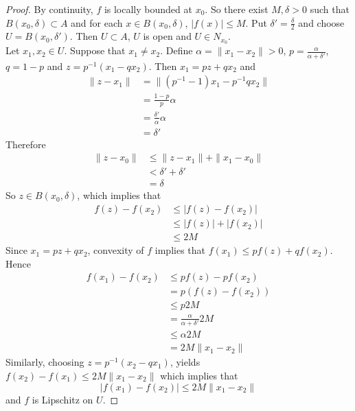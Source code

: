 \documentclass[12pt]{amsart}
\theoremstyle{definition}
\newcommand{\al}{\alpha}
\newcommand{\del}{\delta}
\begin{document}
	\begin{proof}
	By continuity, $f$ is locally bounded at $x_0$. So there exist $M, \del >0$ such that $B(x_0, \del) \subset A$ and for each $x \in B(x_0, \del)$, $|f(x)| \leq M$. Put $\del' = \frac{\del}{2}$ and choose $U = B(x_0, \del')$. Then $U \subset A$, $U$ is open and $U \in N_{x_0}$. \\
	Let $x_1, x_2 \in U$. Suppose that $x_1 \neq x_2$. Define $\al = \|x_1 - x_2\| >0$, $p = \frac{\al}{\al + \del'}$, $q = 1-p$ and $z = p^{-1}(x_1 - qx_2)$. Then $x_1 = pz + qx_2$ and 
	\begin{align*}
	\|z - x_1\| 
	&= \|(p^{-1} - 1)x_1 - p^{-1}qx_2\| \\
	&= \frac{1-p}{p} \al \\
	&= \frac{\del'}{\al} \al \\
	&= \del ' 
	\end{align*}
	Therefore 
	\begin{align*}
	\|z - x_0\| 
	& \leq \|z - x_1\| + \|x_1 - x_0\| \\
	& <  \del '  + \del '  \\
	&= \del
\end{align*}	  
	So $z \in B(x_0, \del)$, which implies that 
	\begin{align*}
	f(z) - f(x_2) 
	& \leq |f(z) - f(x_2)|\\ 
	&\leq |f(z)| + |f(x_2)| \\
	&\leq 2M
\end{align*}		
	Since $x_1 = pz + qx_2$, convexity of $f$ implies that $f(x_1) \leq pf(z) + qf(x_2)$. Hence 
	\begin{align*}
	f(x_1) - f(x_2) 
	& \leq pf(z) -pf(x_2) \\
	&= p(f(z) - f(x_2)) \\
	& \leq p 2M \\
	&= \frac{\al}{\al + \del'} 2M \\
	& \leq \al 2M \\
	&= 2M \|x_1 - x_2 \|
	\end{align*}
	Similarly, choosing $z = p^{-1}(x_2 - qx_1)$, yields $f(x_2) - f(x_1) \leq 2M \|x_1 - x_2 \|$ which implies that $$|f(x_1) - f(x_2)| \leq 2M \|x_1 - x_2 \|$$ and $f$ is Lipschitz on $U$. 
 	\end{proof}



	
	
	
	
	
	
	
	
	
	
\end{document}
